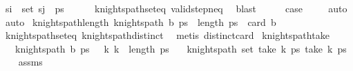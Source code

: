 \begin{isabellebody}
\ {\isachardoublequoteopen}s\isactrlsub i\ {\isasymnotin}\ set\ {\isacharparenleft}{\kern0pt}s\isactrlsub j\ {\isacharhash}{\kern0pt}\ ps{\isacharparenright}{\kern0pt}{\isachardoublequoteclose}\isanewline
\ \ \ \ \isamarkupfalse%
\ knights{\isacharunderscore}{\kern0pt}path{\isacharunderscore}{\kern0pt}set{\isacharunderscore}{\kern0pt}eq\ valid{\isacharunderscore}{\kern0pt}step{\isacharunderscore}{\kern0pt}neq\ \isamarkupfalse%
\ blast\isanewline
\ \ \isamarkupfalse%
\ \isamarkupfalse%
\ {\isacharquery}{\kern0pt}case\ \isamarkupfalse%
\ {}\ \isamarkupfalse%
\ auto\isanewline
{}\isamarkupfalse%
\ auto%
\endisatagproof
{\isafoldproof}%
%
\isadelimproof
\isanewline
%
\endisadelimproof
\isanewline
{}\isamarkupfalse%
\ knights{\isacharunderscore}{\kern0pt}path{\isacharunderscore}{\kern0pt}length{\isacharcolon}{\kern0pt}\ {\isachardoublequoteopen}knights{\isacharunderscore}{\kern0pt}path\ b\ ps\ {\isasymLongrightarrow}\ length\ ps\ {\isacharequal}{\kern0pt}\ card\ b{\isachardoublequoteclose}\isanewline
%
\isadelimproof
\ \ %
\endisadelimproof
%
\isatagproof
{}\isamarkupfalse%
\ knights{\isacharunderscore}{\kern0pt}path{\isacharunderscore}{\kern0pt}set{\isacharunderscore}{\kern0pt}eq\ knights{\isacharunderscore}{\kern0pt}path{\isacharunderscore}{\kern0pt}distinct\ \isamarkupfalse%
\ {\isacharparenleft}{\kern0pt}metis\ distinct{\isacharunderscore}{\kern0pt}card{\isacharparenright}{\kern0pt}%
\endisatagproof
{\isafoldproof}%
%
\isadelimproof
\isanewline
%
\endisadelimproof
\isanewline
{}\isamarkupfalse%
\ knights{\isacharunderscore}{\kern0pt}path{\isacharunderscore}{\kern0pt}take{\isacharcolon}{\kern0pt}\ \isanewline
\ \ \ {\isachardoublequoteopen}knights{\isacharunderscore}{\kern0pt}path\ b\ ps{\isachardoublequoteclose}\ {\isachardoublequoteopen}{}\ {\isacharless}{\kern0pt}\ k{\isachardoublequoteclose}\ {\isachardoublequoteopen}k\ {\isacharless}{\kern0pt}\ length\ ps{\isachardoublequoteclose}\isanewline
\ \ \ {\isachardoublequoteopen}knights{\isacharunderscore}{\kern0pt}path\ {\isacharparenleft}{\kern0pt}set\ {\isacharparenleft}{\kern0pt}take\ k\ ps{\isacharparenright}{\kern0pt}{\isacharparenright}{\kern0pt}\ {\isacharparenleft}{\kern0pt}take\ k\ ps{\isacharparenright}{\kern0pt}{\isachardoublequoteclose}\isanewline
%
\isadelimproof
\ \ %
\endisadelimproof
%
\isatagproof
{}\isamarkupfalse%
\ assms\ \isanewline
{}\isamarkupfalse%

\end{isabellebody}
